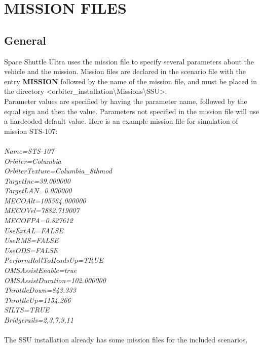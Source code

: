 \documentclass[Space_Shuttle_Ultra_Manual.tex]{subfiles}
\begin{document}
\section{MISSION FILES}
\begin{multicols*}{2}
\label{sec:mission-files}
\renewcommand{\cfttoctitlefont}{\bf}
\localtableofcontents
\end{multicols*}

\subsection{General}
\begin{multicols*}{2}
\noindent
Space Shuttle Ultra uses the mission file to specify several parameters about the vehicle and the mission. Mission files are declared in the scenario file with the entry \textbf{MISSION} followed by the name of the mission file, and must be placed in the directory <orbiter\_installation\textbackslash Missions\textbackslash SSU>.
\\
Parameter values are specified by having the parameter name, followed by the equal sign and then the value. Parameters not specified in the mission file will use a hardcoded default value. Here is an example mission file for simulation of mission STS-107$\colon $
\\
\\
\textit{Name=STS-107}
\\
\textit{Orbiter=Columbia}
\\
\textit{OrbiterTexture=Columbia\_8thmod}
\\
\textit{TargetInc=39.000000}
\\
\textit{TargetLAN=0.000000}
\\
\textit{MECOAlt=105564.000000}
\\
\textit{MECOVel=7882.719007}
\\
\textit{MECOFPA=0.827612}
\\
\textit{UseExtAL=FALSE}
\\
\textit{UseRMS=FALSE}
\\
\textit{UseODS=FALSE}
\\
\textit{PerformRollToHeadsUp=TRUE}
\\
\textit{OMSAssistEnable=true}
\\
\textit{OMSAssistDuration=102.000000}
\\
\textit{ThrottleDown=843.333}
\\
\textit{ThrottleUp=1154.266}
\\
\textit{SILTS=TRUE}
\\
\textit{Bridgerails=2,3,7,9,11}
\\
\\
The SSU installation already has some mission files for the included scenarios.

\end{multicols*}
\end{document}
